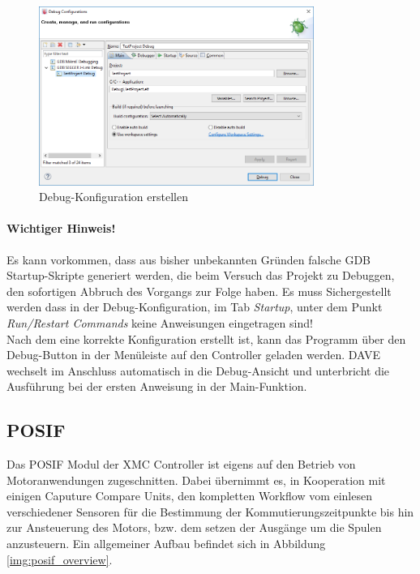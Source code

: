 \begin{figure}[h]
\centering
\includegraphics[width=0.8\textwidth]{sensor/dave_debugConfig.PNG}
\caption{Debug-Konfiguration erstellen}
\label{img:dave_debugConfig}
\end{figure}

\paragraph{Wichtiger Hinweis!} Es kann vorkommen, dass aus bisher unbekannten Gründen falsche GDB Startup-Skripte generiert werden, die beim Versuch das Projekt zu Debuggen, den sofortigen Abbruch des Vorgangs zur Folge haben. Es muss Sichergestellt werden dass in der Debug-Konfiguration, im Tab \textit{Startup}, unter dem Punkt \textit{Run/Restart Commands} keine Anweisungen eingetragen sind! \\

\noindent
Nach dem eine korrekte Konfiguration erstellt ist, kann das Programm über den Debug-Button in der Menüleiste auf den Controller geladen werden. DAVE wechselt im Anschluss automatisch in die Debug-Ansicht und unterbricht die Ausführung bei der ersten Anweisung in der Main-Funktion.

\subsection{POSIF}
\label{lbl:sensor_posif}
Das POSIF Modul der XMC Controller ist eigens auf den Betrieb von Motoranwendungen zugeschnitten. Dabei übernimmt es, in Kooperation mit einigen Caputure Compare Units, den kompletten Workflow vom einlesen verschiedener Sensoren für die Bestimmung der Kommutierungszeitpunkte bis hin zur Ansteuerung des Motors, bzw. dem setzen der Ausgänge um die Spulen anzusteuern. Ein allgemeiner Aufbau befindet sich in Abbildung \ref{img:posif_overview}.

